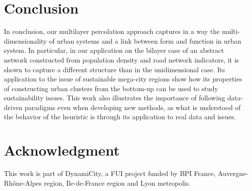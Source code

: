 \documentclass{jimis-en}
\begin{document}
  

\section{Conclusion}


In conclusion, our multilayer percolation approach captures in a way the multi-dimensionality of urban systems and a link between form and function in urban system. In particular, in our application on the bilayer case of an abstract network constructed from population density and road network indicators, it is shown to capture a different structure than in the unidimensional case. Its application to the issue of sustainable mega-city regions show how its properties of constructing urban clusters from the bottom-up can be used to study sustainability issues. This work also illustrates the importance of following data-driven paradigms even when developing new methods, as what is understood of the behavior of the heuristic is through its application to real data and issues.



\section*{Acknowledgment}

This work is part of DynamiCity, a FUI project funded by BPI France, Auvergne-Rh{\^o}ne-Alpes region, Ile-de-France region and Lyon metropolis.



\end{document}
